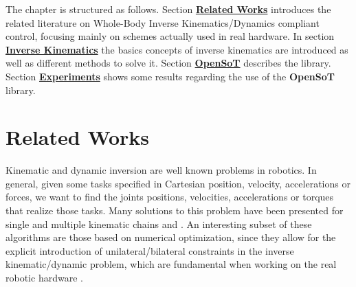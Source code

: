 The chapter is structured as follows. Section \hyperref[sec:robot-Cartesian-control:related-works]{\textbf{Related Works}} introduces the related literature on Whole-Body Inverse Kinematics/Dynamics compliant control, focusing mainly on schemes actually used in real hardware. In section \hyperref[sec:robot-Cartesian-control:inverse-kinematics]{\textbf{Inverse Kinematics}} the basics concepts of inverse kinematics are introduced as well as different methods to solve it.
Section \hyperref[sec:robot-Cartesian-control:opensot]{\textbf{OpenSoT}} describes the library. Section \hyperref[sec:robot-Cartesian-control:experiments]{\textbf{Experiments}} shows some results regarding the use of the \textbf{OpenSoT} library.

\section{Related Works}
\label{sec:robot-Cartesian-control:related-works}
Kinematic and dynamic inversion are well known problems in robotics. In general, given some tasks specified in Cartesian position, velocity, accelerations or forces, we want to find the joints positions, velocities, accelerations or torques that realize those tasks. Many solutions to this problem have been presented for single and multiple kinematic chains \cite{Siciliano:90} and \cite{Wensing:13}. An interesting subset of these algorithms are those based on numerical optimization, since they allow for the explicit introduction of unilateral/bilateral constraints in the inverse kinematic/dynamic problem, which are fundamental when working on the real robotic hardware \cite{Escande:12}.

